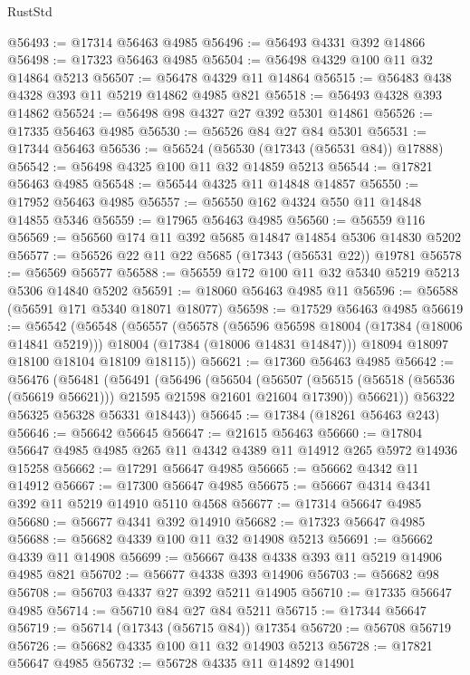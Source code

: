 \begin{lexlean}{RustStd}
\begin{coremodule}
@56493 := @17314 @56463 @4985
@56496 := @56493 @4331 @392 @14866
@56498 := @17323 @56463 @4985
@56504 := @56498 @4329 @100 @11 @32 @14864 @5213
@56507 := @56478 @4329 @11 @14864
@56515 := @56483 @438 @4328 @393 @11 @5219 @14862 @4985 @821
@56518 := @56493 @4328 @393 @14862
@56524 := @56498 @98 @4327 @27 @392 @5301 @14861
@56526 := @17335 @56463 @4985
@56530 := @56526 @84 @27 @84 @5301
@56531 := @17344 @56463
@56536 := @56524 (@56530 (@17343 (@56531 @84)) @17888)
@56542 := @56498 @4325 @100 @11 @32 @14859 @5213
@56544 := @17821 @56463 @4985
@56548 := @56544 @4325 @11 @14848 @14857
@56550 := @17952 @56463 @4985
@56557 := @56550 @162 @4324 @550 @11 @14848 @14855 @5346
@56559 := @17965 @56463 @4985
@56560 := @56559 @116
@56569 := @56560 @174 @11 @392 @5685 @14847 @14854 @5306 @14830 @5202
@56577 := @56526 @22 @11 @22 @5685 (@17343 (@56531 @22)) @19781
@56578 := @56569 @56577
@56588 := @56559 @172 @100 @11 @32 @5340 @5219 @5213 @5306 @14840 @5202
@56591 := @18060 @56463 @4985 @11
@56596 := @56588 (@56591 @171 @5340 @18071 @18077)
@56598 := @17529 @56463 @4985
@56619 := @56542
    (@56548
      (@56557
        (@56578
          (@56596 @56598 @18004 (@17384 (@18006 @14841 @5219)))
          @18004
          (@17384 (@18006 @14831 @14847)))
        @18094
        @18097
        @18100
        @18104
        @18109
        @18115))
@56621 := @17360 @56463 @4985
@56642 := @56476
    (@56481
      (@56491
        (@56496
          (@56504
            (@56507 (@56515 (@56518 (@56536 (@56619 @56621))) @21595 @21598 @21601 @21604 @17390))
            @56621))
        @56322
        @56325
        @56328
        @56331
        @18443))
@56645 := @17384 (@18261 @56463 @243)
@56646 := @56642 @56645
@56647 := @21615 @56463
@56660 := @17804 @56647 @4985 @4985 @265 @11 @4342 @4389 @11 @14912 @265 @5972 @14936 @15258
@56662 := @17291 @56647 @4985
@56665 := @56662 @4342 @11 @14912
@56667 := @17300 @56647 @4985
@56675 := @56667 @4314 @4341 @392 @11 @5219 @14910 @5110 @4568
@56677 := @17314 @56647 @4985
@56680 := @56677 @4341 @392 @14910
@56682 := @17323 @56647 @4985
@56688 := @56682 @4339 @100 @11 @32 @14908 @5213
@56691 := @56662 @4339 @11 @14908
@56699 := @56667 @438 @4338 @393 @11 @5219 @14906 @4985 @821
@56702 := @56677 @4338 @393 @14906
@56703 := @56682 @98
@56708 := @56703 @4337 @27 @392 @5211 @14905
@56710 := @17335 @56647 @4985
@56714 := @56710 @84 @27 @84 @5211
@56715 := @17344 @56647
@56719 := @56714 (@17343 (@56715 @84)) @17354
@56720 := @56708 @56719
@56726 := @56682 @4335 @100 @11 @32 @14903 @5213
@56728 := @17821 @56647 @4985
@56732 := @56728 @4335 @11 @14892 @14901

\end{coremodule}
\end{lexlean}
